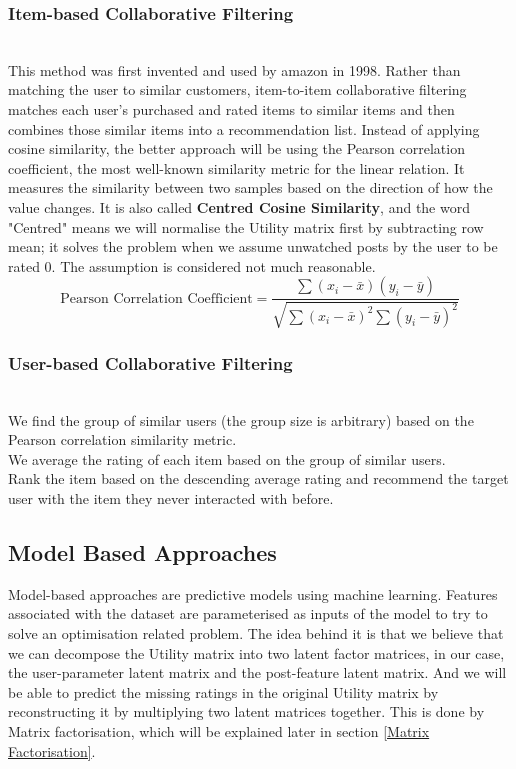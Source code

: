 \subsubsection{Item-based Collaborative Filtering}
\\This method was first invented and used by amazon in 1998. 
Rather than matching the user to similar customers, item-to-item collaborative filtering matches each user’s purchased and rated items to similar items and then combines those similar items into a recommendation list.
Instead of applying cosine similarity, the better approach will be using the Pearson correlation coefficient, the most well-known similarity metric for the linear relation. It measures the similarity between two samples based on the direction of how the value changes. It is also called \textbf{Centred Cosine Similarity}, and the word "Centred" means we will normalise the Utility matrix first by subtracting row mean; it solves the problem when we assume unwatched posts by the user to be rated 0. The assumption is considered not much reasonable.
\begin{equation*}
\text{Pearson Correlation Coefficient} = \frac{\sum(x_{i} - \bar{x})(y_{i} - \bar{y})} {\sqrt{\sum(x_{i} - \bar{x})^{2} \sum{(y_{i} - \bar{y})^{2} }}}
\end{equation*}

\subsubsection{User-based Collaborative Filtering}
\\We find the group of similar users (the group size is arbitrary) based on the Pearson correlation similarity metric.
\\We average the rating of each item based on the group of similar users.
\\Rank the item based on the descending average rating and recommend the target user with the item they never interacted with before.

\subsection{Model Based Approaches}
Model-based approaches are predictive models using machine learning. Features associated with the dataset are parameterised as inputs of the model to try to solve an optimisation related problem. The idea behind it is that we believe that we can decompose the Utility matrix into two latent factor matrices, in our case, the user-parameter latent matrix and the post-feature latent matrix. And we will be able to predict the missing ratings in the original Utility matrix by reconstructing it by multiplying two latent matrices together. This is done by Matrix factorisation, which will be explained later in section \ref{Matrix Factorisation}.
